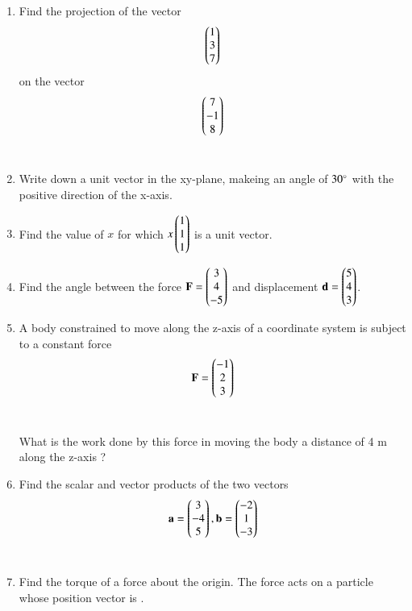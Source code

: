 \begin{enumerate}[label=\arabic*.,ref=\thesubsection.\theenumi]
\item Find the projection of the vector 
\begin{align}
\begin{pmatrix}1\\3\\7\end{pmatrix}
\end{align}
on the vector
\begin{align}
\begin{pmatrix}7\\-1\\8\end{pmatrix}
\end{align}
\\
\solution 

\item Write down a unit vector in the xy-plane, makeing an angle of $30\degree$ with the positive direction of the x-axis.
\\
\solution 


\item Find the value of $x$ for which $x\begin{pmatrix}1\\1\\1\end{pmatrix}$ is a unit vector.
\\
\solution

\item Find the angle between the force $\mathbf{F} = \begin{pmatrix}3\\4\\-5\end{pmatrix}$ and displacement $\mathbf{d} = \begin{pmatrix}5\\4\\3\end{pmatrix}$.
%
\item A body constrained to move along the z-axis of a coordinate system is subject to a constant force
\begin{align}
\mathbf{F} = \begin{pmatrix}-1\\2\\3\end{pmatrix}
\end{align}
\\
\solution 

%
What is the work done by this force in moving the body a distance of 4 m along the z-axis ?
\item Find the scalar and vector products of the two vectors
\begin{align}
\mathbf{a} = \begin{pmatrix}3\\-4\\5\end{pmatrix}, 
\mathbf{b} = \begin{pmatrix}-2\\1\\-3\end{pmatrix}
\end{align}
%
\\
\solution 

\item Find the torque of a force 
about the origin. The force
acts on a particle whose position vector is .
\end{enumerate}
%
